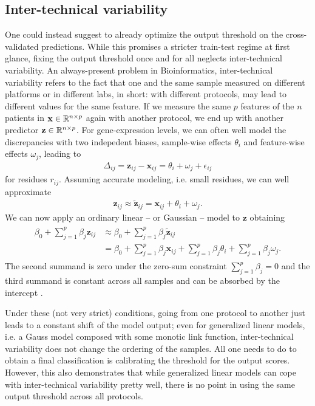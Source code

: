 \subsection{Inter-technical variability} 
One could instead suggest to already optimize the output threshold on the cross-validated 
predictions. While this promises a stricter train-test regime at first glance, fixing the output 
threshold once and for all neglects inter-technical variability. An always-present problem in 
Bioinformatics, inter-technical variability refers to the fact that one and the same sample 
measured on different platforms or in different labs, in short: with different protocols, may 
lead to different values for the same feature. If we measure the same $p$ features of the $n$ 
patients in $\mathbf{x} \in \mathbb{R}^{n \times p}$ again with another protocol, we end up with another predictor 
$\mathbf{z} \in \mathbb{R}^{n \times p}$.
For gene-expression levels,
we can often well model the discrepancies with two indepedent biases, sample-wise effects $\theta_i$
and feature-wise effects $\omega_j$, leading to
\begin{align}
    \Delta_{ij} = \mathbf{z}_{ij} - \mathbf{x}_{ij} = \theta_i + \omega_j + \epsilon_{ij}
\end{align}
for residues $r_{ij}$. Assuming accurate modeling, i.e. small residues, we can well approximate
\begin{align}
    \mathbf{z}_{ij} \approx \tilde{\mathbf{z}}_{ij} = \mathbf{x}_{ij} + \theta_i + \omega_j.
\end{align}
We can now apply an ordinary linear -- or Gaussian -- model to $\mathbf{z}$ obtaining
\begin{align} \label{eq:inter-tech}
\begin{split}
    \beta_0 + \sum_{j=1}^p \beta_j \mathbf{z}_{ij} &\approx \beta_0 + \sum_{j=1}^p \beta_j \tilde{\mathbf{z}}_{ij} \\
    &= \beta_0 + \sum_{j=1}^p \beta_j \mathbf{x}_{ij} + \sum_{j=1}^p \beta_j \theta_i + \sum_{j=1}^p \beta_j \omega_j.
\end{split}
\end{align}
The second summand is zero under the zero-sum constraint $\sum_{j = 1}^p \beta_j = 0$ and the third 
summand is constant across all samples and can be absorbed by the intercept \cite{transplatform17}. 

Under these (not very 
strict) conditions, going from one protocol to another just leads to a constant shift of the model 
output; even for generalized linear models, i.e. a Gauss model composed with some monotic link function,
inter-technical variability does not change the ordering of the samples. All one needs to do to 
obtain a final classification is calibrating the threshold for the output scores. However, this 
also demonstrates that while generalized linear models can cope with inter-technical variability 
pretty well, there is no point in using the same output threshold across all protocols.

